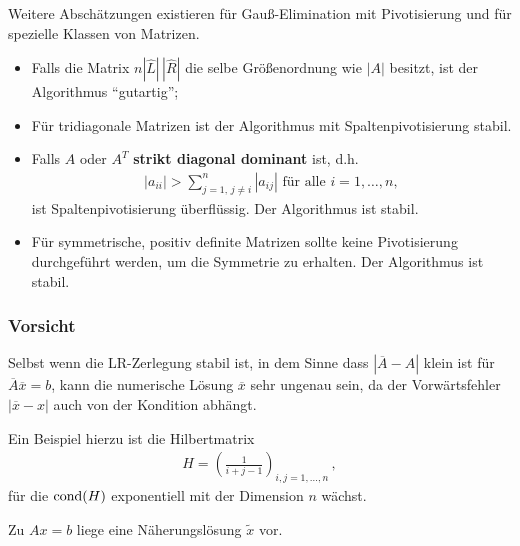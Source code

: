 Weitere Abschätzungen existieren für Gauß-Elimination mit 
Pivotisierung und für spezielle Klassen von Matrizen.

\label{III.3.13}
\begin{itemize}
\item Falls die Matrix $n | \hat{ L} | \,  |\hat{ R}|$ die
  selbe Größenordnung wie $| A|$ besitzt, ist der
  Algorithmus \enquote{gutartig};
\item Für tridiagonale Matrizen  ist der Algorithmus mit
  Spaltenpivotisierung stabil.
\item Falls $ A$ oder $ A^T$  \textbf{strikt diagonal
    dominant} ist, d.h. 
  \begin{gather*}
    | a_{ii} | > \sum\limits_{j=1 ,\, j \not = i}^{n} | a_{ij}| 
    \mbox{ für alle } i = 1, \ldots, n,
  \end{gather*}
  ist Spaltenpivotisierung überflüssig. Der Algorithmus ist stabil.
\item Für symmetrische, positiv definite Matrizen sollte keine Pivotisierung
  durchgeführt werden, um die Symmetrie zu erhalten.
  Der Algorithmus ist stabil.
\end{itemize}

\subsubsection{Vorsicht}
Selbst wenn die LR-Zerlegung stabil ist, in dem Sinne dass
$| \overline{ A} - A|$ klein ist für
$ \overline{ A}\overline{ x}  =  b $, 
kann die numerische Lösung $\overline{ x}$ sehr
ungenau sein, da der Vorwärtsfehler $| \overline{ x} - {  x}| $ auch von der
Kondition abhängt.

Ein Beispiel hierzu ist die Hilbertmatrix
\begin{gather*}
  H  =  \left( \frac{1}{i + j -1 } \right)_{i,j= 1,\ldots, n}\, ,
\end{gather*}
für die $\operatorname{cond} ( H)$ exponentiell mit der Dimension $n$ wächst.


Zu $Ax=b$ liege eine Näherungslösung $\widetilde{x}$ vor.


